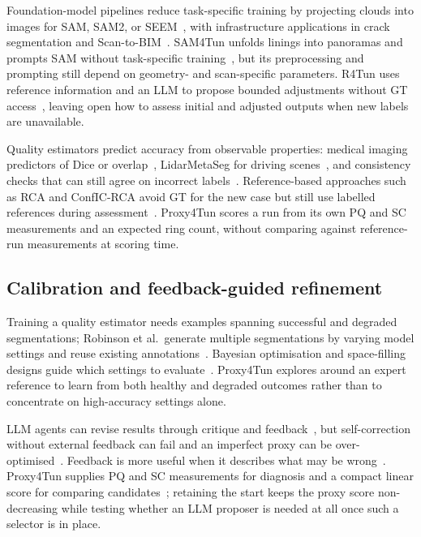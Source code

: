 \documentclass[a4paper,fleqn]{cas-dc}
\begin{document}
Foundation-model pipelines reduce task-specific training by projecting clouds into images for SAM, SAM2, or SEEM~\cite{kirillov2023sam,ravi2024sam2,zou2023segment}, with infrastructure applications in crack segmentation and Scan-to-BIM~\cite{ge2024cracksam,ye2024sam,wang2024omni,pan2024zero,ye2026maintenance}. SAM4Tun unfolds linings into panoramas and prompts SAM without task-specific training~\cite{ye2025sam4tun}, but its preprocessing and prompting still depend on geometry- and scan-specific parameters. R4Tun uses reference information and an LLM to propose bounded adjustments without GT access~\cite{taoR4Tun}, leaving open how to assess initial and adjusted outputs when new labels are unavailable.

Quality estimators predict accuracy from observable properties: medical imaging predictors of Dice or overlap~\cite{kohlberger2012evaluating,robinson2018segmentationQuality}, LidarMetaSeg for driving scenes~\cite{colling2021lidarmetaseg}, and consistency checks that can still agree on incorrect labels~\cite{bogdoll2025labelfree}. Reference-based approaches such as RCA and ConfIC-RCA avoid GT for the new case but still use labelled references during assessment~\cite{valindria2017rca,cosarinsky2026conficrca}. Proxy4Tun scores a run from its own PQ and SC measurements and an expected ring count, without comparing against reference-run measurements at scoring time.

\subsection{Calibration and feedback-guided refinement}

Training a quality estimator needs examples spanning successful and degraded segmentations; Robinson et al.\ generate multiple segmentations by varying model settings and reuse existing annotations~\cite{robinson2018segmentationQuality}. Bayesian optimisation and space-filling designs guide which settings to evaluate~\cite{souza2020prior,hvarfner2022pibo,joe2008constructing,gramacy2009adaptive,gramacy2020surrogates}. Proxy4Tun explores around an expert reference to learn from both healthy and degraded outcomes rather than to concentrate on high-accuracy settings alone.

LLM agents can revise results through critique and feedback~\cite{madaan2023selfrefine,shinn2023reflexion,novikov2025alphaevolve,zhang2025darwin}, but self-correction without external feedback can fail and an imperfect proxy can be over-optimised~\cite{huang2024selfcorrect,gao2023overoptimization}. Feedback is more useful when it describes what may be wrong~\cite{yao2023react}. Proxy4Tun supplies PQ and SC measurements for diagnosis and a compact linear score for comparing candidates~\cite{rudin2019stop}; retaining the start keeps the proxy score non-decreasing while testing whether an LLM proposer is needed at all once such a selector is in place.
\end{document}

